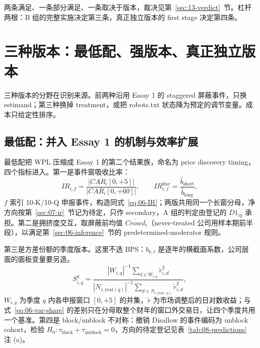 \documentclass[a4paper,11pt]{ctexart}
\begin{document}
两条满足、一条部分满足、一条取决于版本，裁决见第~\ref{sec:13-verdict}~节。杠杆两根：B 组的完整实施决定第三条，真正独立版本的 first stage 决定第四条。
\clearpage

\section{三种版本：最低配、强版本、真正独立版本}\label{sec:11-versions}

三种版本的分野在识别来源。前两种沿用 Essay 1 的 staggered 屏蔽事件，只换 estimand；第三种换掉 treatment，或把 robots.txt 状态降为预定的调节变量。成本只给定性排序。

\subsection{最低配：并入 Essay 1 的机制与效率扩展}\label{sec:11-minimal}

最低配把 WPL 压缩成 Essay 1 的第二个结果族，命名为 price discovery timing，四个指标进入。第一是事件窗吸收比率：
\begin{equation}\label{eq:11-ir}
IR_{i,f}=\frac{\left|CAR_{i}[0,+5]\right|}{\left|CAR_{i}[0,+60]\right|},\qquad
IR^{\text{fine}}_{i,f}=\frac{\hat b_{\text{short}}}{\hat b_{\text{long}}},
\end{equation}
$f$ 索引 10-K/10-Q 申报事件，构造同式~\eqref{eq:06-IR}\citep{dellavignapollet2009}；两版共用同一个长窗分母，净方向按第~\ref{sec:07-ir}~节记为待定，只作 secondary，A 组的判定由登记的 $D1_{iy}$ 承担。第二是拥挤度交互，取屏蔽前均值 $\overline{Crowd}_i$（never-treated 公司用样本期前半段），以满足第~\ref{sec:06-inference}~节的 predetermined-moderator 规则\citep{hirshleiferlimteoh2009}。

第三是方差份额的季度版本。这里不选 BPS：$b_{k,t}$ 是逐年的横截面系数，公司层面的面板变量要另造\citep{baiphilipponsavov2016}。
\begin{equation}\label{eq:11-vshare}
S^{q}_{i,q}=\frac{|W_{i,q}|^{-1}\sum_{d\in W_{i,q}}\tilde r_{i,d}^{2}}{|N_{i,\mathrm{year}(q)}|^{-1}\sum_{d\in N_{i,\mathrm{year}(q)}}\tilde r_{i,d}^{2}},
\end{equation}
$W_{i,q}$ 为季度 $q$ 内各申报窗口 $[0,+5]$ 的并集，$\tilde r$ 为市场调整后的日对数收益；与式~\eqref{eq:06-var-share} 的差别只在分母取整个财年的窗口外交易日，让四个季度共用一个基准\citep{beaver1968}。第四是 block/unblock 不对称：撤销 Disallow 的事件编码为 unblock cohort，检验 $H_0:\tau_{\text{block}}+\tau_{\text{unblock}}=0$，方向的待定登记见表~\ref{tab:08-predictions} 注 (a)\citep{merton1987,chennoronhasingal2004}。
\end{document}
